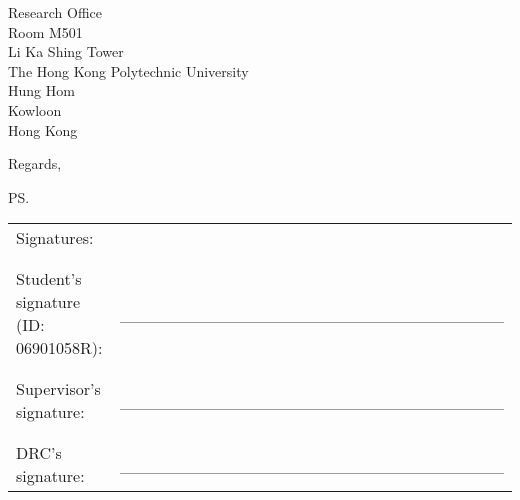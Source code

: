 \documentclass[a4paper]{letter}
\begin{document}
\begin{letter}{Research Office \\ Room M501 \\ Li Ka Shing Tower \\ The Hong Kong Polytechnic University \\ Hung Hom \\ Kowloon \\ Hong Kong}
\closing{Regards,}
\ps{\begin{tabular}{  p{8cm}  p{6cm}  }
Signatures:\\\\\\
Student's signature (ID: 06901058R): & \_\_\_\_\_\_\_\_\_\_\_\_\_\_\_\_\_\_\_\_\_\_\_\_\_\_\_\_\_\_\_\_ \\\\\\
Supervisor's signature: & \_\_\_\_\_\_\_\_\_\_\_\_\_\_\_\_\_\_\_\_\_\_\_\_\_\_\_\_\_\_\_\_ \\\\\\
DRC's signature: & \_\_\_\_\_\_\_\_\_\_\_\_\_\_\_\_\_\_\_\_\_\_\_\_\_\_\_\_\_\_\_\_
\end{tabular}}

\end{letter}


%
\end{document}
